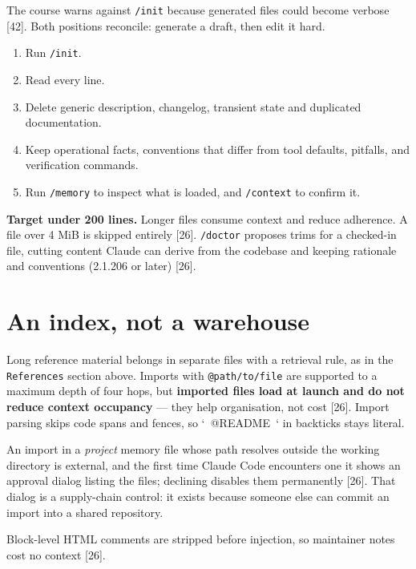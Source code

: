 \documentclass[11pt,a4paper,twoside,openany]{book}
\begin{document}
The course warns against \texttt{/\allowbreak{}init} because generated files could become verbose [42]. Both positions reconcile: generate a draft, then edit it hard.


\begin{enumerate}
\item Run \texttt{/\allowbreak{}init}.
\item Read every line.
\item Delete generic description, changelog, transient state and duplicated documentation.
\item Keep operational facts, conventions that differ from tool defaults, pitfalls, and verification commands.
\item Run \texttt{/\allowbreak{}memory} to inspect what is loaded, and \texttt{/\allowbreak{}context} to confirm it.
\end{enumerate}

\textbf{Target under 200 lines.} Longer files consume context and reduce adherence. A file over 4 MiB is skipped entirely [26]. \texttt{/\allowbreak{}doctor} proposes trims for a checked-in file, cutting content Claude can derive from the codebase and keeping rationale and conventions (2.1.206 or later) [26].


\FloatBarrier
\setcounter{section}{3}
\section{An index, not a warehouse}

Long reference material belongs in separate files with a retrieval rule, as in the \texttt{References} section above. Imports with \texttt{@path/\allowbreak{}to/\allowbreak{}file} are supported to a maximum depth of four hops, but \textbf{imported files load at launch and do not reduce context occupancy} — they help organisation, not cost [26]. Import parsing skips code spans and fences, so `\texttt{ }@README\texttt{ }` in backticks stays literal.


An import in a \emph{project} memory file whose path resolves outside the working directory is external, and the first time Claude Code encounters one it shows an approval dialog listing the files; declining disables them permanently [26]. That dialog is a supply-chain control: it exists because someone else can commit an import into a shared repository.


Block-level HTML comments are stripped before injection, so maintainer notes cost no context [26].
\end{document}
